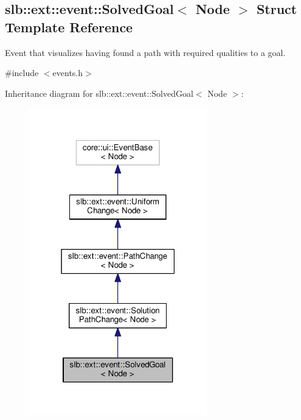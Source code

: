 \hypertarget{structslb_1_1ext_1_1event_1_1SolvedGoal}{}\subsection{slb\+:\+:ext\+:\+:event\+:\+:Solved\+Goal$<$ Node $>$ Struct Template Reference}
\label{structslb_1_1ext_1_1event_1_1SolvedGoal}


Event that visualizes having found a path with required qualities to a goal.  




{\ttfamily \#include $<$events.\+h$>$}



Inheritance diagram for slb\+:\+:ext\+:\+:event\+:\+:Solved\+Goal$<$ Node $>$\+:\nopagebreak
\begin{figure}[H]
\begin{center}
\leavevmode
\includegraphics[width=219pt]{structslb_1_1ext_1_1event_1_1SolvedGoal__inherit__graph}
\end{center}
\end{figure}


